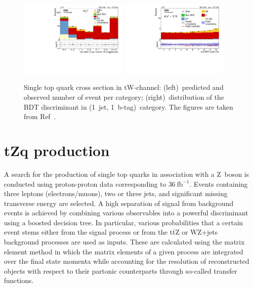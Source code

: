 \documentclass[12pt]{article}
\begin{document}
\begin{figure}[!htb]
\begin{center}
\includegraphics[width=0.47\textwidth]{tW-categories.pdf}\hspace{0.02\textwidth}
\includegraphics[width=0.47\textwidth]{tW-bdt.pdf}
\caption{\label{fig:tw}Single top quark cross section in tW-channel: (left)~predicted and observed number of event per category; (right)~distribution of the BDT discriminant in (1~jet, 1~b-tag)~category. The figures are taken from Ref~\cite{tw-inc}.}
\end{center}
\end{figure}


\section{tZq production}

A search for the production of single top quarks in association with a Z~boson is conducted using proton-proton data corresponding to $36~\mathrm{fb}^{-1}$. Events containing three leptons (electrons/muons), two or three jets, and significant missing transverse energy are selected. A high separation of signal from background events is achieved by combining various observables into a powerful discriminant using a boosted decision tree. In particular, various probabilities that a certain event stems either from the signal process or from the $\mathrm{t}\bar{\mathrm{t}}\mathrm{Z}$ or WZ+jets background processes are used as inputs. These are calculated using the matrix element method in which the matrix elements of a given process are integrated over the final state momenta while accounting for the resolution of reconstructed objects with respect to their partonic counterparts through so-called transfer functions.
\end{document}
